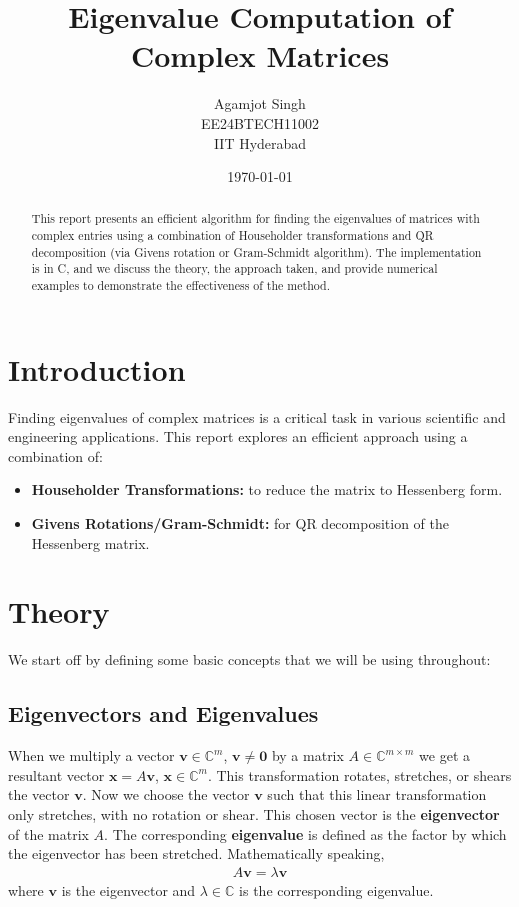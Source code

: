 \documentclass[12pt]{article}
\title{\textbf{Eigenvalue Computation of Complex Matrices}}
\author{Agamjot Singh\\EE24BTECH11002\\IIT Hyderabad}
\date{\today}
\newcommand{\vecb}[1]{\mathbf{#1}}
\newcommand{\defmat}[2]{#1\in\mathbb{C}^{#2\times#2}}
\newcommand{\defvec}[2]{\vecb{#1}\in\mathbb{C}^{#2}}
\begin{document}
\maketitle

\begin{abstract}
This report presents an efficient algorithm for finding the eigenvalues of matrices with complex entries using a combination of Householder transformations and QR decomposition (via Givens rotation or Gram-Schmidt algorithm). The implementation is in C, and we discuss the theory, the approach taken, and provide numerical examples to demonstrate the effectiveness of the method.
\end{abstract}

\section{Introduction}
Finding eigenvalues of complex matrices is a critical task in various scientific and engineering applications. This report explores an efficient approach using a combination of:
\begin{itemize}
    \item \textbf{Householder Transformations:} to reduce the matrix to Hessenberg form.
    \item \textbf{Givens Rotations/Gram-Schmidt:} for QR decomposition of the Hessenberg matrix.
\end{itemize}

\section{Theory}
We start off by defining some basic concepts that we will be using throughout:
\subsection{Eigenvectors and Eigenvalues}
When we multiply a vector $\defvec{v}{m}$, $\vecb{v} \neq \vecb{0}$ by a matrix $\defmat{A}{m}$ we get a resultant vector $\vecb{x} = A\vecb{v}$, $\defvec{x}{m}$. This transformation rotates, stretches, or shears the vector $\vecb{v}$. Now we choose the vector $\vecb{v}$ such that this linear transformation only stretches, with no rotation or shear.
This chosen vector is the \textbf{eigenvector} of the matrix $A$. The corresponding \textbf{eigenvalue} is defined as the factor by which the eigenvector has been stretched.
\newline
Mathematically speaking,
\begin{align}
\label{eigen:1}
    A\vecb{v} = \lambda\vecb{v}
\end{align}
where $\vecb{v}$ is the eigenvector and $\lambda \in \mathbb{C}$ is the corresponding eigenvalue.
\newline
\end{document}

